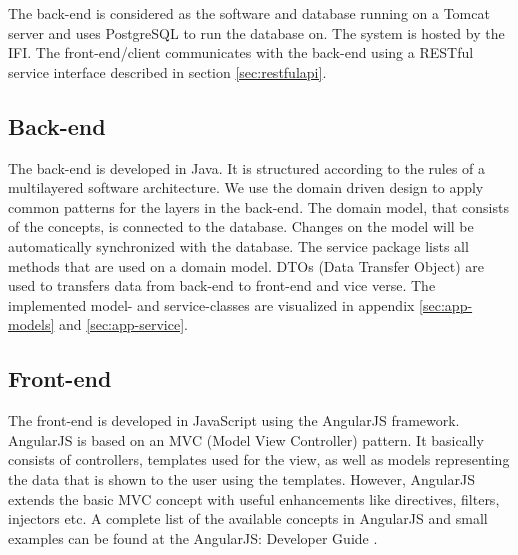 The back-end is considered as the software and database running on a Tomcat \cite{tomcat} server and uses PostgreSQL \cite{postgresql} to run the database on. The system is hosted by the IFI. The front-end/client communicates with the back-end using a RESTful service interface described in section \ref{sec:restfulapi}.

\subsection{Back-end}
The back-end is developed in Java. It is structured according to the rules of a multilayered software architecture. We use the domain driven design \cite{ddd} to apply common patterns for the layers in the back-end. The domain model, that consists of the concepts, is connected to the database. Changes on the model will be automatically synchronized with the database. The service package lists all methods that are used on a domain model.\newline
DTOs (Data Transfer Object) are used to transfers data from back-end to front-end and vice verse. \newline The implemented model- and service-classes are visualized in appendix \ref{sec:app-models} and \ref{sec:app-service}. \par

\subsection{Front-end}
The front-end is developed in JavaScript using the AngularJS \cite{angular} framework. AngularJS is based on an MVC (Model View Controller) pattern. It basically consists of controllers, templates used for the view, as well as models representing the data that is shown to the user using the templates. However, AngularJS \cite{angular} extends the basic MVC concept with useful enhancements like directives, filters, injectors etc. A complete list of the available concepts in AngularJS and small examples can be found at the AngularJS: Developer Guide \cite{angular-devguide}.

